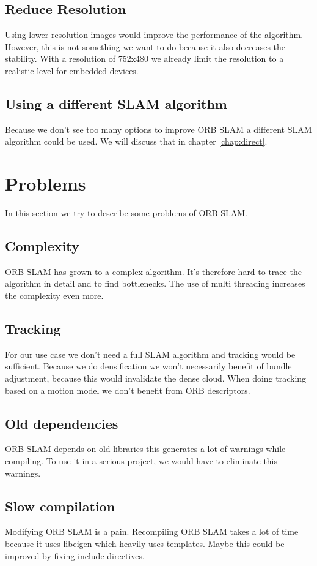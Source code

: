 \documentclass[11pt,a4paper,titlepage,oneside]{report}
\begin{document}
\subsection{Reduce Resolution}
Using lower resolution images would improve the performance of the algorithm. However, this is not something we want to do because it also decreases the stability. With a resolution of 752x480 we already limit the resolution to a realistic level for embedded devices.

\subsection{Using a different SLAM algorithm}
Because we don't see too many options to improve ORB SLAM a different SLAM algorithm could be used. We will discuss that in chapter \ref{chap:direct}.

\section{Problems}

In this section we try to describe some problems of ORB SLAM.

\subsection{Complexity}
ORB SLAM has grown to a complex algorithm. It's therefore hard to trace the algorithm in detail and to find bottlenecks. The use of multi threading increases the complexity even more.

\subsection{Tracking}
For our use case we don't need a full SLAM algorithm and tracking would be sufficient. Because we do densification we won't necessarily benefit of bundle adjustment, because this would invalidate the dense cloud. When doing tracking based on a motion model we don't benefit from ORB descriptors.

\subsection{Old dependencies}
ORB SLAM depends on old libraries this generates a lot of warnings while compiling. To use it in a serious project, we would have to eliminate this warnings.

\subsection{Slow compilation}
Modifying ORB SLAM is a pain. Recompiling ORB SLAM takes a lot of time because it uses libeigen which heavily uses templates. Maybe this could be improved by fixing include directives.
\end{document}
